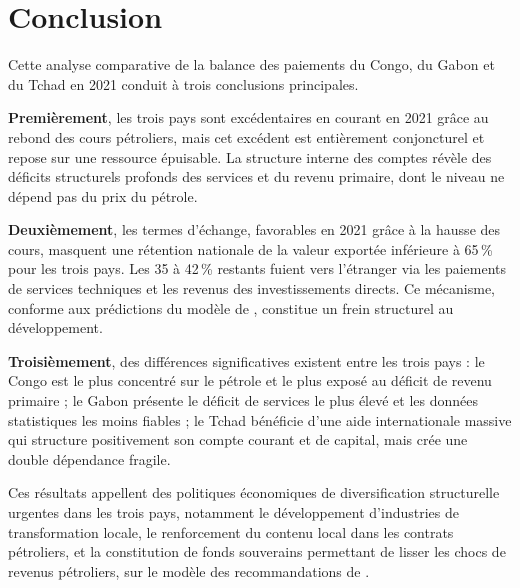 \documentclass[12pt,a4paper]{article}
\begin{document}
\section{Conclusion}

Cette analyse comparative de la balance des paiements du Congo, du Gabon et du Tchad en
2021 conduit à trois conclusions principales.

\textbf{Premièrement}, les trois pays sont excédentaires en courant en 2021 grâce au rebond
des cours pétroliers, mais cet excédent est entièrement conjoncturel et repose sur une
ressource épuisable. La structure interne des comptes révèle des déficits structurels
profonds des services et du revenu primaire, dont le niveau ne dépend pas du prix du pétrole.

\textbf{Deuxièmement}, les termes d'échange, favorables en 2021 grâce à la hausse des cours,
masquent une rétention nationale de la valeur exportée inférieure à 65\,\% pour les trois
pays. Les 35 à 42\,\% restants fuient vers l'étranger via les paiements de services techniques
et les revenus des investissements directs. Ce mécanisme, conforme aux prédictions du modèle
de \textcite{cordenneary1982}, constitue un frein structurel au développement.

\textbf{Troisièmement}, des différences significatives existent entre les trois pays : le
Congo est le plus concentré sur le pétrole et le plus exposé au déficit de revenu primaire ;
le Gabon présente le déficit de services le plus élevé et les données statistiques les moins
fiables ; le Tchad bénéficie d'une aide internationale massive qui structure positivement
son compte courant et de capital, mais crée une double dépendance fragile.

Ces résultats appellent des politiques économiques de diversification structurelle urgentes
dans les trois pays, notamment le développement d'industries de transformation locale, le
renforcement du contenu local dans les contrats pétroliers, et la constitution de fonds
souverains permettant de lisser les chocs de revenus pétroliers, sur le modèle des
recommandations de \textcite{imfcemac2021}.

\printbibliography[title={Références bibliographiques}]
\end{document}
